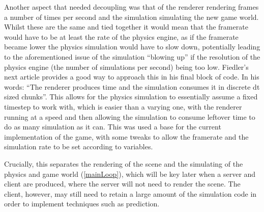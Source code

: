 \documentclass[titlepage]{article}
\begin{document}
	Another aspect that needed decoupling was that of the renderer rendering frames a number of times per second and the simulation simulating the new game world. Whilst these are the same and tied together it would mean that the framerate would have to be at least the rate of the physics engine, as if the framerate became lower the physics simulation would have to slow down, potentially leading to the aforementioned issue of the simulation ``blowing up'' if the resolution of the physics engine (the number of simulations per second) being too low. Fiedler's next article \cite{fiedlerTimestep} provides a good way to approach this in his final block of code. In his words: ``The renderer produces time and the simulation consumes it in discrete dt sized chunks''. This allows for the physics simulation to essentially assume a fixed timestep to work with, which is easier than a varying one, with the renderer running at a speed and then allowing the simulation to consume leftover time to do as many simulation as it can. This was used a base for the current implementation of the game, with some tweaks to allow the framerate and the simulation rate to be set according to variables.
	
	Crucially, this separates the rendering of the scene and the simulating of the physics and game world (\ref{mainLoop}), which will be key later when a server and client are produced, where the server will not need to render the scene. The client, however, may still need to retain a large amount of the simulation code in order to implement techniques such as prediction.

\linespread{1.0}
\end{document}
